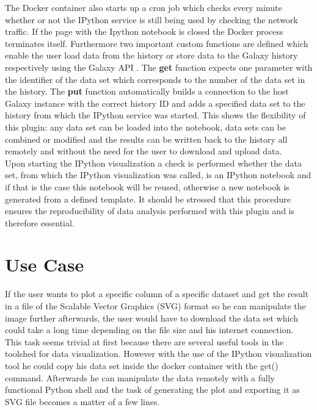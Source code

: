\documentclass{bioinfo}
\begin{document}
\begin{methods}
The Docker container also starts up a cron job which checks every minute whether or not the IPython service is still being used by checking the network traffic. If the page with the Ipython notebook is closed the Docker process terminates itself. Furthermore two important custom functions are defined which enable the user load data from the history or store data to the Galaxy history respectively using the Galaxy API \citep{Sloggett2013}. The \textbf{get} function expects one parameter with the identifier of the data set which corresponds to the number of the data set in the history. The \textbf{put} function automatically builds a connection to the host Galaxy instance with the correct history ID and adds a specified data set to the history from which the IPython service was started. This shows the flexibility of this plugin: any data set can be loaded into the notebook, data sets can be combined or modified and the results can be written back to the history all remotely and without the need for the user to download and upload data. \\
Upon starting the IPython visualization a check is performed whether the data set, from which the IPython visualization was called, is an IPython notebook and if that is the case this notebook will be reused, otherwise a new notebook is generated from a defined template. It should be stressed that this procedure ensures the reproducibility of data analysis performed with this plugin and is therefore essential. 


\section{Use Case}

If the user wants to plot a specific column of a specific dataset and get the result in a file of the Scalable Vector Graphics (SVG) format so he can manipulate the image further afterwards, the user would have to download the data set which could take a long time depending on the file size and his internet connection. This task seems trivial at first because there are several useful tools in the toolshed for data visualization. However with the use of the IPython visualization tool he could copy his data set inside the docker container with the get() command. Afterwards he can manipulate the data remotely with a fully functional Python shell and the task of generating the plot and exporting it as SVG file becomes a matter of a few lines. 


\end{methods}
\end{document}
